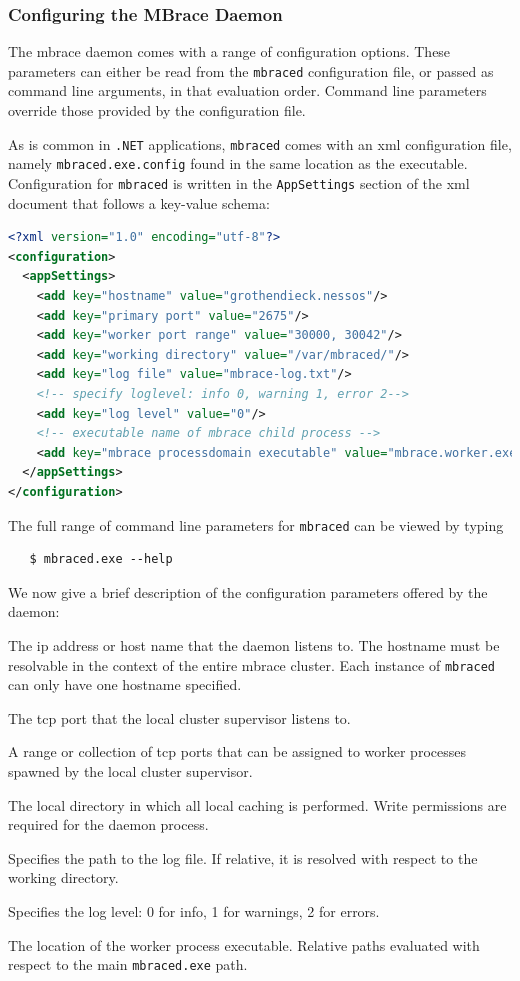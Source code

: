 \documentclass[9pt,a4paper]{article}
\newcommand{\mbrace}{mbrace}
\newcommand{\TitularMbrace}{MBrace}
\newcommand{\dotnet}{\texttt{\hbox{.}NET}}
\begin{document}
\subsubsection*{Configuring the \TitularMbrace{} Daemon}

The \mbrace{} daemon comes with a range of configuration options.
These parameters can either be read from the \texttt{mbraced} configuration file, 
or passed as command line arguments, in that evaluation order.
Command line parameters override those provided by the configuration file.

As is common in \dotnet{} applications, \texttt{mbraced} comes with an xml
configuration file, namely \texttt{mbraced.exe.config} found in the same location 
as the executable. Configuration for \texttt{mbraced} is written in the 
\texttt{AppSettings} section of the xml document that follows a key-value 
schema:
\begin{lstlisting}[language=Xml]
<?xml version="1.0" encoding="utf-8"?>
<configuration>
  <appSettings>
    <add key="hostname" value="grothendieck.nessos"/>
    <add key="primary port" value="2675"/>
    <add key="worker port range" value="30000, 30042"/>
    <add key="working directory" value="/var/mbraced/"/>
    <add key="log file" value="mbrace-log.txt"/>
    <!-- specify loglevel: info 0, warning 1, error 2-->
    <add key="log level" value="0"/>
    <!-- executable name of mbrace child process -->
    <add key="mbrace processdomain executable" value="mbrace.worker.exe"/>
  </appSettings>
</configuration>
\end{lstlisting}
The full range of command line parameters for \texttt{mbraced} can be viewed by typing
\begin{verbatim}
   $ mbraced.exe --help
\end{verbatim}
%
We now give a brief description of the configuration parameters offered by the daemon:
\begin{description}[style=unboxed, font=\sffamily]
\item[Hostname] The ip address or host name that the daemon listens to.
The hostname must be resolvable in the context of the entire \mbrace{} cluster.
Each instance of \texttt{mbraced} can only have one hostname specified.
\item[Primary Port] The tcp port that the local cluster supervisor listens to.
\item[Worker Port Range] A range or collection of tcp ports that can be assigned
to worker processes spawned by the local cluster supervisor.
\item[Working Directory] The local directory in which all local caching is performed.
Write permissions are required for the daemon process.
\item[Log File] Specifies the path to the log file. If relative, it is resolved with
respect to the working directory.
\item[Log Level] Specifies the log level: 0 for info, 1 for warnings, 2 for errors.
\item[ProcessDomain Executable] The location of the worker process executable.
Relative paths evaluated with respect to the main \texttt{mbraced.exe} path.
\end{description}
\end{document}
